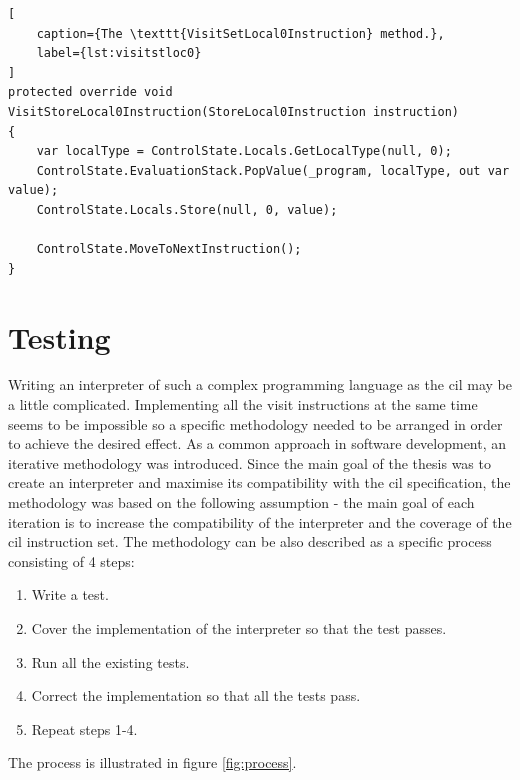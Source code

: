 \documentclass[declaration,shortabstract,english,mgr]{iithesis}
\begin{document}
\begin{lstlisting}[
	caption={The \texttt{VisitSetLocal0Instruction} method.},
	label={lst:visitstloc0}
]
protected override void VisitStoreLocal0Instruction(StoreLocal0Instruction instruction)
{
	var localType = ControlState.Locals.GetLocalType(null, 0);
	ControlState.EvaluationStack.PopValue(_program, localType, out var value);
	ControlState.Locals.Store(null, 0, value);

	ControlState.MoveToNextInstruction();
}
\end{lstlisting}

\clearpage


\chapter{Testing}
\label{sec:testing}

Writing an interpreter of such a complex programming language as the \acrshort{cil} may be a little complicated. Implementing all the visit instructions at the same time seems to be impossible so a specific methodology needed to be arranged in order to achieve the desired effect. As a common approach in software development, an iterative methodology was introduced. Since the main goal of the thesis was to create an interpreter and maximise its compatibility with the \acrshort{cil} specification, the methodology was based on the following assumption - the main goal of each iteration is to increase the compatibility of the interpreter and the coverage of the \acrshort{cil} instruction set. The methodology can be also described as a specific process consisting of 4 steps:
\begin{enumerate}
	\item{Write a test.}
	\item{Cover the implementation of the interpreter so that the test passes.}
	\item{Run all the existing tests.}
	\item{Correct the implementation so that all the tests pass.}
	\item{Repeat steps 1-4.}
\end{enumerate}
The process is illustrated in figure \ref{fig:process}.
\end{document}
